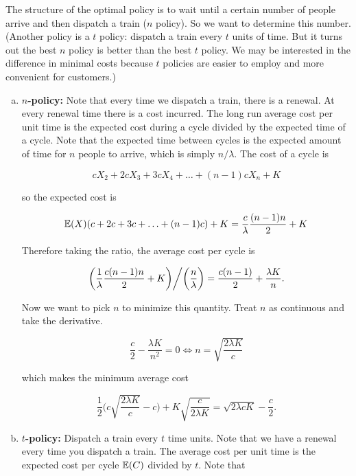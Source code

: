 \begin{solution} 

The structure of the optimal policy is to wait until a certain number of people arrive and then dispatch a train (\(n\) policy). So we want to determine this number. (Another policy is a \(t\) policy: dispatch a train every \(t\) units of time. But it turns out the best \(n\) policy is better than the best \(t\) policy. We may be interested in the difference in minimal costs because \(t\) policies are easier to employ and more convenient for customers.)

\begin{enumerate}[(a)]


\item \textbf{\(n\)-policy:} Note that every time we dispatch a train, there is a renewal. At every renewal time there is a cost incurred. The long run average cost per unit time is the expected cost during a cycle divided by the expected time of a cycle. Note that the expected time between cycles is the expected amount of time for \(n\) people to arrive, which is simply \(n/\lambda\). The cost of a cycle is

\[
cX_2 + 2c X_3 + 3c X_4 + \ldots + (n - 1)c X_n + K
\]

so the expected cost is

\[
\E(X) (c + 2c + 3c+ \ldots + (n-1)c) + K = \frac{c}{\lambda} \frac{(n-1)n}{2} + K
\]

Therefore taking the ratio, the average cost per cycle is 

\[
\left(  \frac{1}{\lambda} \frac{c(n-1)n}{2}  + K \bigg) \middle/ \bigg( \frac{n}{\lambda} \right) = \frac{c(n-1)}{2} + \frac{\lambda K}{n}.
\]

Now we want to pick \(n\) to minimize this quantity. Treat \(n\) as continuous and take the derivative.

\[
\frac{c}{2}  - \frac{\lambda K}{n^2} = 0 \iff n = \sqrt{\frac{2 \lambda K}{c}}
\]

which makes the minimum average cost

\[
 \frac{1}{2} \bigg(c \sqrt{\frac{2 \lambda K}{c}}-c\bigg)  + K  \sqrt{\frac{c}{2 \lambda K}} = \sqrt{2 \lambda c K } - \frac{c}{2}.
\]

\item \textbf{\(t\)-policy:} Dispatch a train every \(t\) time units. Note that we have a renewal every time you dispatch a train. The average cost per unit time is the expected cost per cycle \(\E(C)\) divided by \(t\). Note that


\end{enumerate}
\end{solution}
